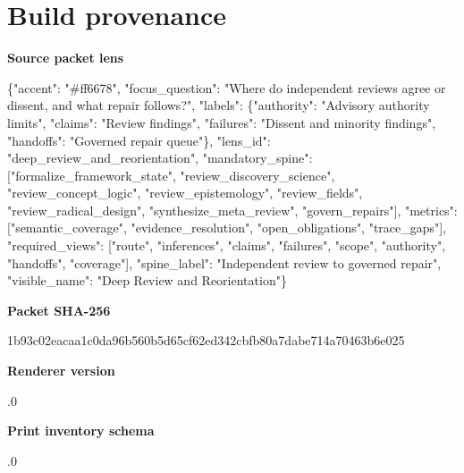\documentclass[10pt,a4paper]{article}
\newcommand{\TraceField}[2]{\par\noindent\textbf{#1}\par\noindent #2\par\smallskip}
\begin{document}
\section{Build provenance}\label{app-provenance}
\TraceField{Source packet lens}{\{"accent":\allowbreak{} "\#ff6678",\allowbreak{} "focus\_\allowbreak{}question":\allowbreak{} "Where do independen\allowbreak{}t reviews agree or dissent, and what repair follows?",\allowbreak{} "labels":\allowbreak{} \{"authorit\allowbreak{}y":\allowbreak{} "Advisory authority limits", "claims":\allowbreak{} "Review findings",\allowbreak{} "failures"\allowbreak{}:\allowbreak{} "Dissent and minority findings",\allowbreak{} "handoffs"\allowbreak{}:\allowbreak{} "Governed repair queue"\}, "lens\_\allowbreak{}id":\allowbreak{} "deep\_\allowbreak{}review\_\allowbreak{}and\_\allowbreak{}reorientat\allowbreak{}ion", "mandatory\allowbreak{}\_\allowbreak{}spine":\allowbreak{} ["formaliz\allowbreak{}e\_\allowbreak{}framework\_\allowbreak{}state", "review\_\allowbreak{}discovery\_\allowbreak{}science", "review\_\allowbreak{}concept\_\allowbreak{}logic", "review\_\allowbreak{}epistemolo\allowbreak{}gy", "review\_\allowbreak{}fields", "review\_\allowbreak{}radical\_\allowbreak{}design", "synthesiz\allowbreak{}e\_\allowbreak{}meta\_\allowbreak{}review", "govern\_\allowbreak{}repairs"],\allowbreak{} "metrics":\allowbreak{} ["semantic\allowbreak{}\_\allowbreak{}coverage",\allowbreak{} "evidence\_\allowbreak{}resolution\allowbreak{}", "open\_\allowbreak{}obligation\allowbreak{}s", "trace\_\allowbreak{}gaps"], "required\_\allowbreak{}views":\allowbreak{} ["route", "inference\allowbreak{}s", "claims", "failures"\allowbreak{}, "scope", "authority\allowbreak{}", "handoffs"\allowbreak{}, "coverage"\allowbreak{}], "spine\_\allowbreak{}label":\allowbreak{} "Independe\allowbreak{}nt review to governed repair", "visible\_\allowbreak{}name":\allowbreak{} "Deep Review and Reorientat\allowbreak{}ion"\}}
\TraceField{Packet SHA-256}{1b93c02eac\allowbreak{}aa1c0da96b\allowbreak{}560b5d65cf\allowbreak{}62ed342cbf\allowbreak{}b80a7dabe7\allowbreak{}14a70463b6\allowbreak{}e025}
\TraceField{Renderer version}{1.\allowbreak{}0}
\TraceField{Print inventory schema}{1.\allowbreak{}0}
\end{document}
